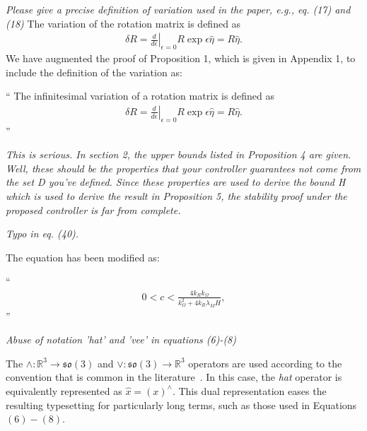 \documentclass[11pt]{article}
\newcommand{\parenth}[1]{\ensuremath{\left( #1 \right)}}
\newcommand{\diff}[2]{\ensuremath{\frac{d #1}{d #2}}}
\newcommand{\so}{\ensuremath{\mathfrak{so}(3)}}
\newcommand{\R}{\ensuremath{\mathbb{R}}}
\newenvironment{correction}{\begin{list}{}{\setlength{\leftmargin}{1cm}\setlength{\rightmargin}{1cm}}\vspace{\parsep}\item[]``}{''\end{list}}
\begin{document}
\begin{enumerate}
\item \textit{Please give a precise definition of variation used in the paper, e.g., eq. (17) and (18)}
The variation of the rotation matrix is defined as
\begin{align*}
    \delta R = \left. \diff{}{\epsilon} \right|_{\epsilon=0} R \exp{\epsilon \hat{\eta}} = R \hat{\eta} .
\end{align*}
We have augmented the proof of Proposition 1, which is given in Appendix 1, to include the definition of the variation as:
\begin{correction}
The infinitesimal variation of a rotation matrix is defined as
\begin{align*}
    \delta R = \left. \diff{}{\epsilon} \right|_{\epsilon=0} R \exp{\epsilon \hat{\eta}} = R \hat{\eta} .
\end{align*}
\end{correction}

\item \textit{This is serious. In section 2, the upper bounds listed in Proposition 4 are given. Well, these should be the properties that your controller guarantees not come from the set D you've defined. Since these properties are used to derive the bound H which is used to derive the result in Proposition 5, the stability proof under the proposed controller is far from complete.}
\item \textit{Typo in eq. (40).}

The equation has been modified as:
\begin{correction}
\begin{gather}
    0 < c < \frac{4 k_R k_\Omega}{k_\Omega^2 + 4 k_R \lambda_M H} ,
\end{gather}
\end{correction}

\item \textit{Abuse of notation 'hat' and 'vee' in equations (6)-(8)}

The \( \wedge : \R^3 \to \so \) and \( \vee : \so \to \R^3 \) operators are used according to the convention that is common in the literature~\cite{lee2010,lee2011a}.
In this case, the \textit{hat} operator is equivalently represented as \( \hat{x} = \parenth{x}^\wedge \).
This dual representation eases the resulting typesetting for particularly long terms, such as those used in Equations~\((6) - (8)\).

\end{enumerate}
\end{document}
